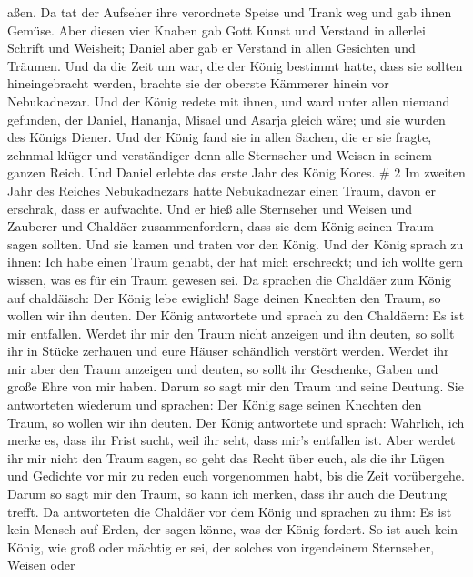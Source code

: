 aßen.  Da tat der Aufseher ihre verordnete Speise und Trank
weg und gab ihnen Gemüse.  Aber diesen vier Knaben gab Gott
Kunst und Verstand in allerlei Schrift und Weisheit; Daniel aber gab er
Verstand in allen Gesichten und Träumen.  Und da die Zeit
um war, die der König bestimmt hatte, dass sie sollten hineingebracht
werden, brachte sie der oberste Kämmerer hinein vor Nebukadnezar.
 Und der König redete mit ihnen, und ward unter allen
niemand gefunden, der Daniel, Hananja, Misael und Asarja gleich wäre;
und sie wurden des Königs Diener.  Und der König fand sie
in allen Sachen, die er sie fragte, zehnmal klüger und verständiger denn
alle Sternseher und Weisen in seinem ganzen Reich.  Und
Daniel erlebte das erste Jahr des König Kores. \# 2  Im
zweiten Jahr des Reiches Nebukadnezars hatte Nebukadnezar einen Traum,
davon er erschrak, dass er aufwachte.  Und er hieß alle
Sternseher und Weisen und Zauberer und Chaldäer zusammenfordern, dass
sie dem König seinen Traum sagen sollten. Und sie kamen und traten vor
den König.  Und der König sprach zu ihnen: Ich habe einen
Traum gehabt, der hat mich erschreckt; und ich wollte gern wissen, was
es für ein Traum gewesen sei.  Da sprachen die Chaldäer zum
König auf chaldäisch: Der König lebe ewiglich! Sage deinen Knechten den
Traum, so wollen wir ihn deuten.  Der König antwortete und
sprach zu den Chaldäern: Es ist mir entfallen. Werdet ihr mir den Traum
nicht anzeigen und ihn deuten, so sollt ihr in Stücke zerhauen und eure
Häuser schändlich verstört werden.  Werdet ihr mir aber den
Traum anzeigen und deuten, so sollt ihr Geschenke, Gaben und große Ehre
von mir haben. Darum so sagt mir den Traum und seine Deutung.
 Sie antworteten wiederum und sprachen: Der König sage
seinen Knechten den Traum, so wollen wir ihn deuten.  Der
König antwortete und sprach: Wahrlich, ich merke es, dass ihr Frist
sucht, weil ihr seht, dass mir's entfallen ist.  Aber werdet
ihr mir nicht den Traum sagen, so geht das Recht über euch, als die ihr
Lügen und Gedichte vor mir zu reden euch vorgenommen habt, bis die Zeit
vorübergehe. Darum so sagt mir den Traum, so kann ich merken, dass ihr
auch die Deutung trefft.  Da antworteten die Chaldäer vor
dem König und sprachen zu ihm: Es ist kein Mensch auf Erden, der sagen
könne, was der König fordert. So ist auch kein König, wie groß oder
mächtig er sei, der solches von irgendeinem Sternseher, Weisen oder

